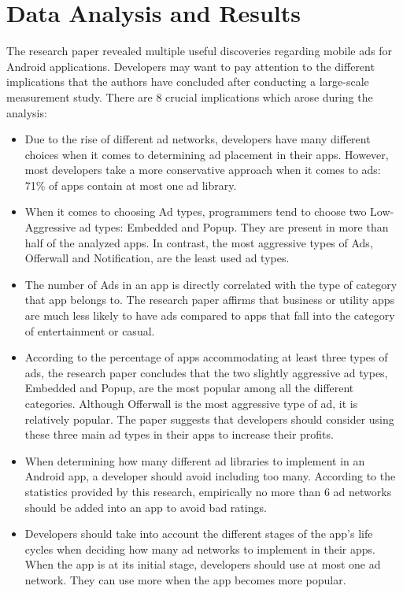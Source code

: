 \documentclass[conference]{IEEEtran}
\begin{document}
\section{Data Analysis and Results}
\label{SectionFive}
The research paper revealed multiple useful discoveries regarding mobile ads for Android applications. Developers may want to pay attention to the different implications that the authors have concluded after conducting a large-scale measurement study. There are 8 crucial implications which arose during the analysis:
\begin{itemize}
\item Due to the rise of different ad networks, developers have many different choices when it comes to determining ad placement in their apps. However, most developers take a more conservative approach when it comes to ads: 71\% of apps contain at most one ad library.
\item When it comes to choosing Ad types, programmers tend to choose two Low-Aggressive ad types: Embedded and Popup. They are present in more than half of the analyzed apps. In contrast, the most aggressive types of Ads, Offerwall and Notification, are the least used ad types.
\item The number of Ads in an app is directly correlated with the type of category that app belongs to. The research paper affirms that business or utility apps are much less likely to have ads compared to apps that fall into the category of entertainment or casual.
\item According to the percentage of apps accommodating at least three types of ads, the research paper concludes that the two slightly aggressive ad types, Embedded and Popup, are the most popular among all the different categories. Although Offerwall is the most aggressive type of ad, it is relatively popular. The paper suggests that developers should consider using these three main ad types in their apps to increase their profits.
\item When determining how many different ad libraries to implement in an Android app, a developer should avoid including too many. According to the statistics provided by this research, empirically no more than 6 ad networks should be added into an app to avoid bad ratings.
\item Developers should take into account the different stages of the app's life cycles when deciding how many ad networks to implement in their apps. When the app is at its initial stage, developers should use at most one ad network. They can use more when the app becomes more popular.

\end{itemize}
\end{document}

